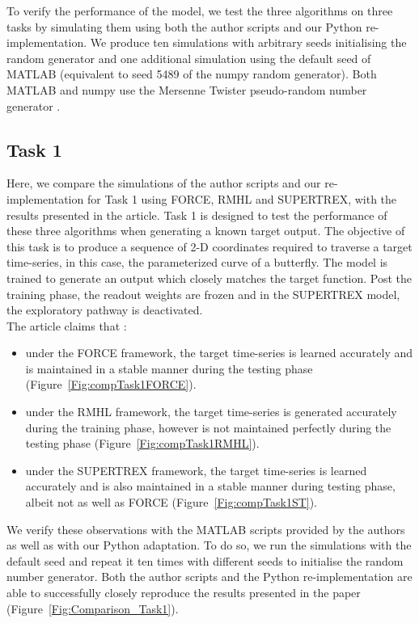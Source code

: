 To verify the performance of the model, we test the three algorithms on three tasks by simulating them using both the author scripts and our Python re-implementation. We produce ten simulations with arbitrary seeds initialising the random generator and one additional simulation using the default seed of MATLAB (equivalent to seed 5489 of the numpy random generator). Both MATLAB and numpy use the Mersenne Twister pseudo-random number generator \cite{matsumoto1998}.



\subsection{Task 1}

Here, we compare the simulations of the author scripts and our re-implementation for Task 1 using FORCE, RMHL and SUPERTREX, with the results presented in the article. Task 1 is designed to test the performance of these three algorithms when generating a known target output. The objective of this task is to produce a sequence of 2-D coordinates required to traverse a target time-series, in this case, the parameterized curve of a butterfly. The model is trained to generate an output which closely matches the target function. Post the training phase, the readout weights are frozen and in the SUPERTREX model, the exploratory pathway is deactivated. \\ 

The article claims that :
\begin{itemize}
\item under the FORCE framework, the target time-series is learned accurately and is maintained in a stable manner during the testing phase (Figure~\ref{Fig:compTask1FORCE}).
\item under the RMHL framework, the target time-series is generated accurately during the training phase, however is not maintained perfectly during the testing phase (Figure~\ref{Fig:compTask1RMHL}).
\item under the SUPERTREX framework, the target time-series is learned accurately and is also maintained in a stable manner during testing phase, albeit not as well as FORCE (Figure~\ref{Fig:compTask1ST}).
\end{itemize}

We verify these observations with the MATLAB scripts provided by the authors as well as with our Python adaptation. To do so, we run the simulations with the default seed and repeat it ten times with different seeds to initialise the random number generator.  Both the author scripts and the Python re-implementation are able to successfully closely reproduce the results presented in the paper (Figure~\ref{Fig:Comparison_Task1}).




